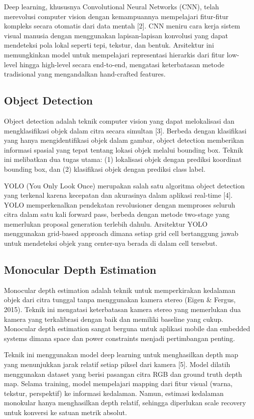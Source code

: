 \documentclass[12pt,a4paper]{report}
\begin{document}
Deep learning, khususnya Convolutional Neural Networks (CNN), telah merevolusi computer vision dengan kemampuannya mempelajari fitur-fitur kompleks secara otomatis dari data mentah [2]. CNN meniru cara kerja sistem visual manusia dengan menggunakan lapisan-lapisan konvolusi yang dapat mendeteksi pola lokal seperti tepi, tekstur, dan bentuk. Arsitektur ini memungkinkan model untuk mempelajari representasi hierarkis dari fitur low-level hingga high-level secara end-to-end, mengatasi keterbatasan metode tradisional yang mengandalkan hand-crafted features.

\subsection{Object Detection}

Object detection adalah teknik computer vision yang dapat melokalisasi dan mengklasifikasi objek dalam citra secara simultan [3]. Berbeda dengan klasifikasi yang hanya mengidentifikasi objek dalam gambar, object detection memberikan informasi spasial yang tepat tentang lokasi objek melalui bounding box. Teknik ini melibatkan dua tugas utama: (1) lokalisasi objek dengan prediksi koordinat bounding box, dan (2) klasifikasi objek dengan prediksi class label.

YOLO (You Only Look Once) merupakan salah satu algoritma object detection yang terkenal karena kecepatan dan akurasinya dalam aplikasi real-time [4]. YOLO memperkenalkan pendekatan revolusioner dengan memproses seluruh citra dalam satu kali forward pass, berbeda dengan metode two-stage yang memerlukan proposal generation terlebih dahulu. Arsitektur YOLO menggunakan grid-based approach dimana setiap grid cell bertanggung jawab untuk mendeteksi objek yang center-nya berada di dalam cell tersebut.

\subsection{Monocular Depth Estimation}

Monocular depth estimation adalah teknik untuk memperkirakan kedalaman objek dari citra tunggal tanpa menggunakan kamera stereo (Eigen \& Fergus, 2015). Teknik ini mengatasi keterbatasan kamera stereo yang memerlukan dua kamera yang terkalibrasi dengan baik dan memiliki baseline yang cukup. Monocular depth estimation sangat berguna untuk aplikasi mobile dan embedded systems dimana space dan power constraints menjadi pertimbangan penting.

Teknik ini menggunakan model deep learning untuk menghasilkan depth map yang menunjukkan jarak relatif setiap piksel dari kamera [5]. Model dilatih menggunakan dataset yang berisi pasangan citra RGB dan ground truth depth map. Selama training, model mempelajari mapping dari fitur visual (warna, tekstur, perspektif) ke informasi kedalaman. Namun, estimasi kedalaman monokular hanya menghasilkan depth relatif, sehingga diperlukan scale recovery untuk konversi ke satuan metrik absolut.
\end{document}
